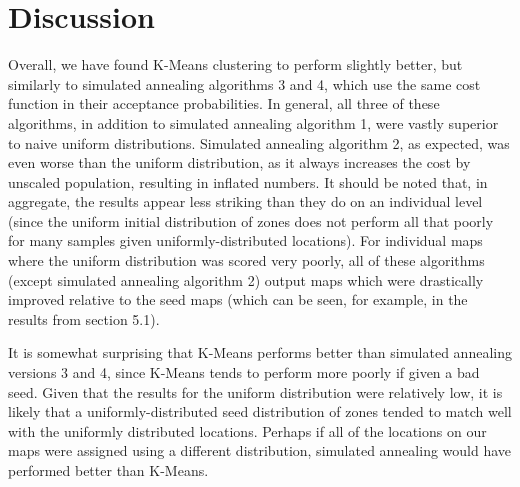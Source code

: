 \documentclass[11pt]{article}
\begin{document}
\section{Discussion}

Overall, we have found K-Means clustering to perform slightly better, but similarly to simulated annealing algorithms 3 and 4, which use the same cost function in their acceptance probabilities. In general, all three of these algorithms, in addition to simulated annealing algorithm 1, were vastly superior to naive uniform distributions. Simulated annealing algorithm 2, as expected, was even worse than the uniform distribution, as it always increases the cost by unscaled population, resulting in inflated numbers. It should be noted that, in aggregate, the results appear less striking than they do on an individual level (since the uniform initial distribution of zones does not perform all that poorly for many samples given uniformly-distributed locations). For individual maps where the uniform distribution was scored very poorly, all of these algorithms (except simulated annealing algorithm 2) output maps which were drastically improved relative to the seed maps (which can be seen, for example, in the results from section 5.1). 

It is somewhat surprising that K-Means performs better than simulated annealing versions 3 and 4, since K-Means tends to perform more poorly if given a bad seed. Given that the results for the uniform distribution were relatively low, it is likely that a uniformly-distributed seed distribution of zones tended to match well with the uniformly distributed locations. Perhaps if all of the locations on our maps were assigned using a different distribution, simulated annealing would have performed better than K-Means.
\end{document}
